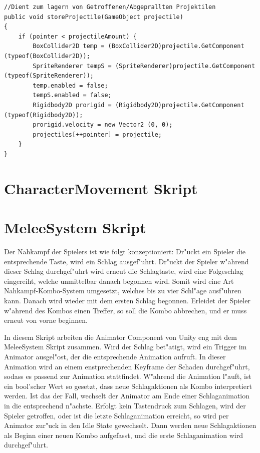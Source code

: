 \begin{lstlisting}[breaklines=true]
//Dient zum lagern von Getroffenen/Abgeprallten Projektilen
public void storeProjectile(GameObject projectile)
{
	if (pointer < projectileAmount) {
		BoxCollider2D temp = (BoxCollider2D)projectile.GetComponent (typeof(BoxCollider2D));
		SpriteRenderer tempS = (SpriteRenderer)projectile.GetComponent (typeof(SpriteRenderer));
		temp.enabled = false;
		tempS.enabled = false;
		Rigidbody2D prorigid = (Rigidbody2D)projectile.GetComponent (typeof(Rigidbody2D));
		prorigid.velocity = new Vector2 (0, 0);
		projectiles[++pointer] = projectile;
	}
}
\end{lstlisting}


\section{CharacterMovement Skript}



\section{MeleeSystem Skript}
Der Nahkampf der Spielers ist wie folgt konzeptioniert:
Dr"uckt ein Spieler die entsprechende Taste, wird ein Schlag ausgef"uhrt. Dr"uckt der Spieler w"ahrend dieser Schlag durchgef"uhrt wird erneut die Schlagtaste, wird eine Folgeschlag eingereiht, welche unmittelbar danach begonnen wird. Somit wird eine Art Nahkampf-Kombo-System umgesetzt, welches bis zu vier Schl"age ausf"uhren kann. Danach wird wieder mit dem ersten Schlag begonnen. Erleidet der Spieler w"ahrend des Kombos einen Treffer, so soll die Kombo abbrechen, und er muss erneut von vorne beginnen.\newline

In diesem Skript arbeiten die Animator Component von Unity eng mit dem MeleeSystem Skript zusammen. Wird der Schlag bet"atigt, wird ein Trigger im Animator ausgel"ost, der die entsprechende Animation aufruft. In dieser Animation wird an einem enstprechenden Keyframe der Schaden durchgef"uhrt, sodass es passend zur Animation stattfindet. W"ahrend die Animation l"auft, ist ein bool'scher Wert so gesetzt, dass neue Schlagaktionen als Kombo interpretiert werden. Ist das der Fall, wechselt der Animator am Ende einer Schlaganimation in die entsprechend n"achste. Erfolgt kein Tastendruck zum Schlagen, wird der Spieler getroffen, oder ist die letzte Schlaganimation erreicht, so wird per Animator zur"uck in den Idle State  gewechselt. Dann werden neue Schlagaktionen als Beginn einer neuen Kombo aufgefasst, und die erste Schlaganimation wird durchgef"uhrt.\newline

